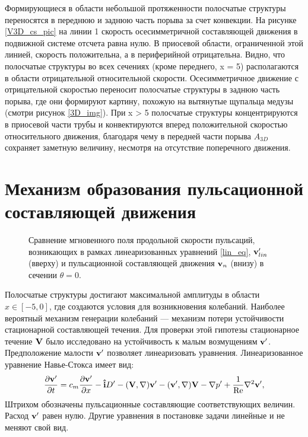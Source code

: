 Формирующиеся в области небольшой протяженности полосчатые структуры переносятся в переднюю и заднюю часть порыва за счет конвекции. На рисунке \ref{V3D_cs_pic} на линии 1 скорость осесимметричной составляющей движения в подвижной системе отсчета равна нулю. В приосевой области, ограниченной этой линией, скорость положительна, а в периферийной отрицательна. Видно, что полосчатые структуры во всех сечениях (кроме переднего, x = 5) располагаются в области отрицательной относительной скорости. Осесимметричное движение с отрицательной скоростью переносит полосчатые структуры в заднюю часть порыва, где они формируют картину, похожую на вытянутые щупальца медузы (смотри рисунок \ref{3D_img}). При x > 5 полосчатые структуры концентрируются в приосевой части трубы и конвектируются вперед положительной скоростью относительного движения, благодаря чему в передней части порыва $A_{3D}$ сохраняет заметную величину, несмотря на отсутствие поперечного движения.


\section{Механизм образования пульсационной составляющей движения}

\begin{figure}
\caption{Сравнение мгновенного поля продольной скорости пульсаций, возникающих в рамках линеаризованных уравнений \eqref{lin_eq}, $\mathbf{v}'_{lin}$ (вверху) и пульсационной составляющей движения $\mathbf{v}_n$ (внизу) в сечении $\theta = 0$.}
\label{lin_ls_cmp_pic}
\end{figure}

Полосчатые структуры достигают максимальной амплитуды в области $x\in[-5,0]$, где создаются условия для возникновения колебаний. Наиболее вероятный механизм генерации колебаний --- механизм потери устойчивости стационарной составляющей течения. Для проверки этой гипотезы стационарное течение $\mathbf{V}$ было исследовано на устойчивость к малым возмущениям $\mathbf{v}'$. Предположение малости $\mathbf{v}'$ позволяет линеаризовать уравнения. Линеаризованное уравнение Навье-Стокса имеет вид: 
\begin{equation} \label{lin_eq}
\frac{\partial \mathbf{v}'}{\partial t} = c_m \frac{\partial \mathbf{v}'}{\partial x} - \mathbf{\hat{i}} D' - (\mathbf{V}, \nabla) \mathbf{v}' - (\mathbf{v}', \nabla) \mathbf{V} - \nabla p' + \frac{1}{\operatorname{Re}} \nabla^2 \mathbf{v}',
\end{equation}
Штрихом обозначены пульсационные составляющие соответствующих величин. Расход $\mathbf{v}'$ равен нулю. Другие уравнения в постановке задачи линейные и не меняют свой вид. 


